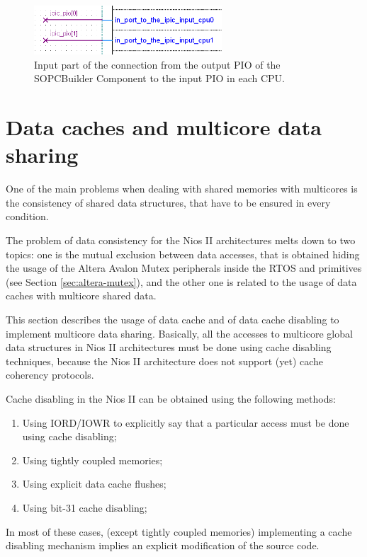 \begin{figure}
  \begin{center}
    \includegraphics[width=7cm, bb=0 0 505 132]{images/IPIC_PIO_in_2cpu.png}
  \end{center}
  \caption{Input part of the connection from
    the output PIO of the SOPCBuilder Component to the input PIO in each
    CPU.}
  \label{fig:IPIC-in-2cpu} 
\end{figure}







\section{Data caches and multicore data sharing}
\label{sec:multicore-shared-data}

One of the main problems when dealing with shared memories with multicores is the consistency of shared data structures, that have to be ensured in every condition.

The problem of data consistency for the Nios II
architectures melts down to two topics: one is the mutual exclusion
between data accesses, that is obtained hiding the usage of the Altera
Avalon Mutex peripherals inside the RTOS  and
 primitives (see Section
\ref{sec:altera-mutex}), and the other one is related to the usage of
data caches with multicore shared data.

This section describes the usage of data cache and of data cache
disabling to implement multicore data sharing. Basically, all the
accesses to multicore global data structures in Nios II
architectures must be done using cache disabling techniques, because
the Nios II architecture does not support (yet) cache coherency protocols.

Cache disabling in the Nios II can be obtained using the following methods:
\begin{enumerate}
\item Using IORD/IOWR to explicitly say that a particular access
  must be done using cache disabling;

\item Using tightly coupled memories;

\item Using explicit data cache flushes;

\item Using bit-31 cache disabling;
\end{enumerate}
In most of these cases, (except tightly coupled memories) implementing
a cache disabling mechanism implies an explicit modification of the
source code.

